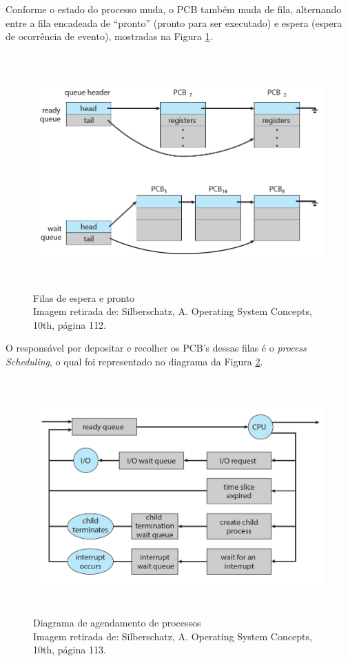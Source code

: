 Conforme o estado do processo muda, o PCB também muda de fila,
alternando entre a fila encadeada de ``pronto'' (pronto para ser
executado) e espera (espera de ocorrência de evento), mostradas na
Figura \ref{fig:Filas de espera e pronto}.

\begin{figure}[h!]
\centering
\includegraphics[keepaspectratio, width=12cm, height=9cm]{imagens/05/05 - Filas de espera e pronto.png}
\caption{Filas de espera e pronto   \\
Imagem retirada de: Silberschatz, A. Operating System Concepts, 10th,
página 112. \\}
\label{fig:Filas de espera e pronto}
\end{figure}



O responsável por depositar e recolher os PCB's dessas filas é o
\emph{process Scheduling}, o qual foi representado no diagrama da Figura
\ref{fig:Diagrama de agendamento de processos}.


\begin{figure}[h!]
\centering
\includegraphics[width=12cm, height=9cm]{imagens/05/05 - Diagrama Agendamento de Processos.png}
\caption{Diagrama de agendamento de processos   \\
Imagem retirada de: Silberschatz, A. Operating System Concepts, 10th,
página 113. \\}
\label{fig:Diagrama de agendamento de processos}
\end{figure}


